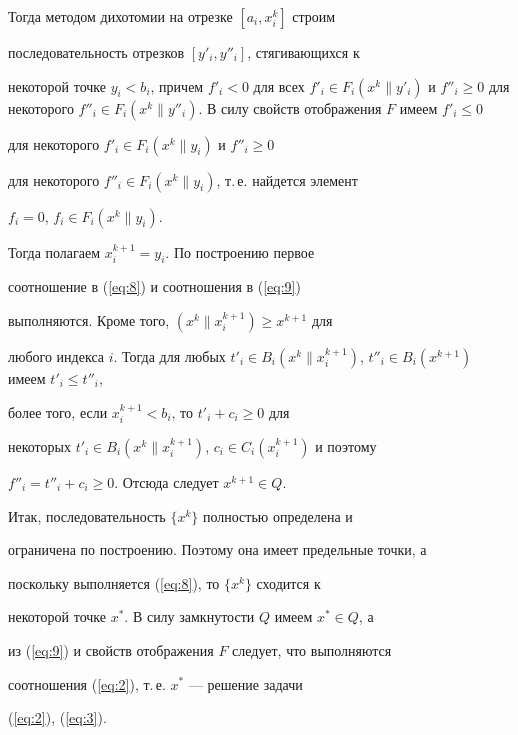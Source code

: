 \begin{pf}
Тогда методом дихотомии на отрезке $[a_i,x^k_i]$ строим


последовательность отрезков $[y'_i,y''_i]$, стягивающихся к


некоторой точке $y_i < b_i$, причем $f'_i<0$ для всех $ f'_i\in


F_i (x^k \| y'_i)$ и $f''_i \ge 0$ для некоторого $f''_i \in F_i


(x^k \| y''_i)$. В силу свойств отображения $F$ имеем $f'_i \le 0$


для некоторого $ f'_i \in F_i (x^k \| y_i)$ и $f''_i \ge 0$


для некоторого  $f''_i \in F_i (x^k\| y_i) $, т.\,е. найдется элемент


$f_i = 0$, $f_i \in F_i (x^k \| y_i) $.


Тогда полагаем $x^{k+1}_i=y_i$. По построению первое


соотношение в (\ref{eq:8}) и соотношения в (\ref{eq:9})


выполняются. Кроме того, $(x^k \| x^{k+1}_i) \ge x^{k+1}$ для


любого индекса $i$. Тогда для любых $t'_i \in B_i (x^k \|


x^{k+1}_i)$, $ t''_i \in B_i (x^{k+1})$ имеем $t'_i \le t''_i$,


более того, если $x^{k+1}_i < b_i$, то $t'_i+c_i \ge 0$ для


некоторых $t'_i \in B_i (x^k\| x^{k+1}_i)$, $c_i \in C_i(x^{k+1}_i)$ и поэтому


$f''_i=t''_i+c_i \ge 0$. Отсюда следует $x^{k+1} \in Q$.





Итак, последовательность $\{x^{k}\}$ полностью определена и


ограничена по построению. Поэтому она имеет предельные точки, а


поскольку выполняется (\ref{eq:8}), то $\{x^{k}\}$ сходится к


некоторой точке $x^*$. В силу замкнутости $Q$ имеем $x^* \in Q$, а


из (\ref{eq:9}) и свойств отображения $F$ следует, что выполняются


соотношения (\ref{eq:2}), т.\,е. $x^*$ --- решение задачи


(\ref{eq:2}), (\ref{eq:3}).


\end{pf}





